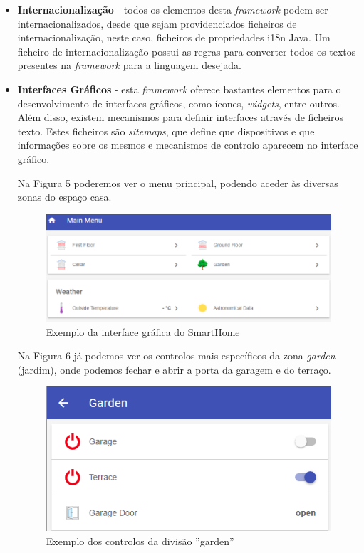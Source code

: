 \begin{itemize}
\item \textbf{Internacionalização} - todos os elementos desta \textit{framework} podem ser internacionalizados, desde que sejam providenciados ficheiros de internacionalização, neste caso, ficheiros de propriedades i18n Java. Um ficheiro de internacionalização possui as regras para converter todos os textos presentes na \textit{framework} para a linguagem desejada.

\item \textbf{Interfaces Gráficos} - esta \textit{framework} oferece bastantes elementos para o desenvolvimento de interfaces gráficos, como ícones, \textit{widgets}, entre outros. Além disso, existem mecanismos para definir interfaces através de ficheiros texto. Estes ficheiros são \textit{sitemaps}, que define que dispositivos e que informações sobre os mesmos e mecanismos de controlo aparecem no interface gráfico.

Na Figura 5 poderemos ver o menu principal, podendo aceder às diversas zonas do espaço casa.

\begin{figure}[H]
  \centering
        \includegraphics[scale=0.7]{img/smarthome-gui.png}
  \caption{Exemplo da interface gráfica do SmartHome}
\end{figure}

Na Figura 6 já podemos ver os controlos mais específicos da zona \textit{garden} (jardim), onde podemos fechar e abrir a porta da garagem e do terraço.

\begin{figure}[H]
  \centering
        \includegraphics[scale=0.7]{img/smarthome-garden.png}
  \caption{Exemplo dos controlos da divisão ''garden''}
\end{figure}

\end{itemize}

